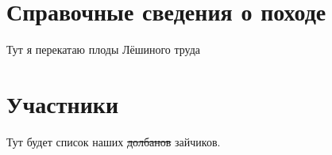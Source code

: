 \section{Справочные сведения о походе} 
Тут я перекатаю плоды Лёшиного труда
\section{Участники} 
Тут будет список наших \sout{долбанов} зайчиков.